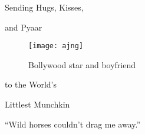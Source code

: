 \documentclass{article}
\renewcommand{\c}[1]{{\color{christmas}#1}}
\begin{document}
\centering

\vspace{1 cm}

{\huge \c{S}ending \c{H}ugs, \c{K}isses, \\[5mm]}

{\huge and \c{P}yaar}\\[5mm]

\begin{figure}[h]
\centering 
\texttt{[image: ajng]}
    \caption{Bollywood star and boyfriend}
\end{figure}

\vspace{0.5 cm}
{\huge to the \c{W}orld's }

\vspace{0.5 cm}

{\huge \c{L}ittlest \c{M}unchkin}

\vspace{2 cm}

\begin{minipage}[c]{.8\textwidth}
    \centering
    \large
    \c{``}Wild horses couldn't drag me away.\c{''}\\[5mm]
    
\end{minipage}
\end{document}
